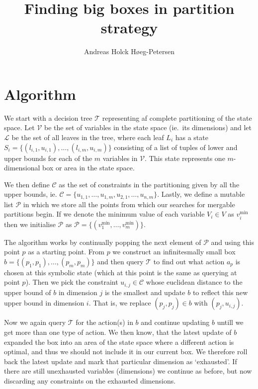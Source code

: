\documentclass{article}
\title{Finding big boxes in partition strategy}
\author{Andreas Holck Høeg-Petersen}
\begin{document}
\maketitle

\section{Algorithm}

We start with a decision tree $\mathcal{T}$ representing af complete
partitioning of the state space. Let $\mathcal{V}$ be the set of variables in
the state space (ie.\ its dimensions) and let $\mathcal{L}$ be the set of all
leaves in the tree, where each leaf $L_{i}$ has a state $S_i =
\{(l_{i,1},u_{i,1}), \ldots, (l_{i,m},u_{i,m})\}$ consisting of a list of tuples
of lower and upper bounds for each of the $m$ variables in $\mathcal{V}$. This
state represents one $m$-dimensional box or area in the state space.

We then define $\mathcal{C}$ as the set of constraints in the partitioning given
by all the upper bounds, ie. $\mathcal{C} = \{ u_{1,1}, \ldots, u_{1,m},
u_{2,1}, \ldots, u_{n, m} \}$. Lastly, we define a mutable list $\mathcal{P}$ in
which we store all the points from which our searches for mergable partitions
begin. If we denote the minimum value of each variable $V_i \in V$ as
$v^{\min}_i$ then we initialise $\mathcal{P}$ as $\mathcal{P} = \{ (v^{\min}_1,
\ldots, v^{\min}_m) \}$.

The algorithm works by continually popping the next element of $\mathcal{P}$ and
using this point $p$ as a starting point. From $p$ we construct an
infinitesmally small box $b = \{ (p_1, p_1), \ldots, (p_m,p_m) \}$ and then
query $\mathcal{T}$ to find out what action $a_p$ is chosen at this symbolic
state (which at this point is the same as querying at point $p$). Then we pick
the constraint $u_{i,j} \in \mathcal{C}$ whose euclidean distance to the upper
bound of $b$ in dimension $j$ is the smallest and update $b$ to reflect this new
upper bound in dimension $i$. That is, we replace $(p_j, p_j) \in b$ with $(p_j,
u_{i,j})$.

Now we again query $\mathcal{T}$ for the action(s) in $b$ and continue updating
$b$ untill we get more than one type of action. We then know, that the latest
update of $b$ expanded the box into an area of the state space where a different
action is optimal, and thus we should not include it in our current box. We
therefore roll back the latest update and mark that particular dimension as
`exhausted'. If there are still unexhausted variables (dimensions) we continue
as before, but now discarding any constraints on the exhausted dimensions.
\end{document}
